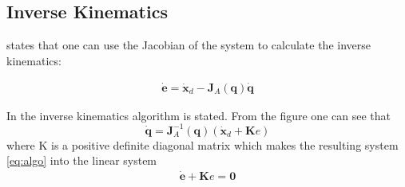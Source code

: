 \subsection*{Inverse Kinematics}
\cite{Siciliano} states that one can use the Jacobian of the system to calculate the inverse kinematics:

\begin{align}\label{eq:algo}
\dot{\bm{e}} = \dot{\bm{x}}_d - \bm{J}_A(\bm{q})\dot{\bm{q}}
\end{align}

In  the inverse kinematics algorithm is stated. From the figure one can see that 
$$
\dot{\bm{q}} = \bm{J}_A^{-1}(\bm{q})(\dot{\bm{x}}_d + \bm{K}e)
$$
where K is a positive definite diagonal matrix which makes the resulting system \eqref{eq:algo} into the linear system
\begin{align*}
    \dot{\bm{e}} + \bm{K}e = \bm{0}
\end{align*}


